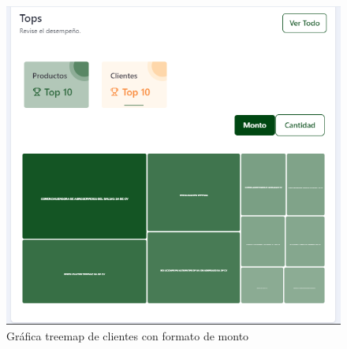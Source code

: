     \begin{figure}[H]
        \begin{center}
            \includegraphics[scale=0.40]{img/actividades/dahsboard-admin/top-clientes-monto.png}
            \caption{Gráfica treemap de clientes con formato de monto}
            \label{fig:top-cliente-monto}
        \end{center}
    \end{figure}